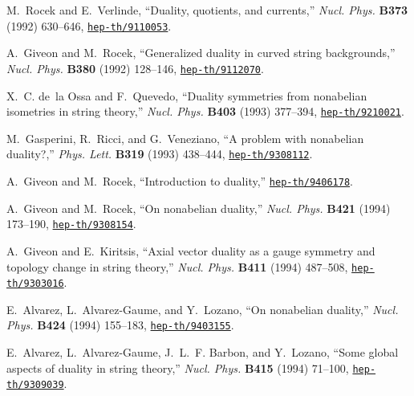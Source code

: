 \documentclass[a4paper,12pt]{article}
\begin{document}
\begin{thebibliography}{10}
M.~Rocek and E.~Verlinde, ``Duality, quotients, and currents,'' {\em Nucl.
  Phys.} {\bf B373} (1992) 630--646,
\href{http://www.arXiv.org/abs/hep-th/9110053}{{\tt hep-th/9110053}}.

A.~Giveon and M.~Rocek, ``Generalized duality in curved string backgrounds,''
  {\em Nucl. Phys.} {\bf B380} (1992) 128--146,
\href{http://www.arXiv.org/abs/hep-th/9112070}{{\tt hep-th/9112070}}.

X.~C. de~la Ossa and F.~Quevedo, ``Duality symmetries from nonabelian
  isometries in string theory,'' {\em Nucl. Phys.} {\bf B403} (1993) 377--394,
\href{http://www.arXiv.org/abs/hep-th/9210021}{{\tt hep-th/9210021}}.

M.~Gasperini, R.~Ricci, and G.~Veneziano, ``A problem with nonabelian
  duality?,'' {\em Phys. Lett.} {\bf B319} (1993) 438--444,
\href{http://www.arXiv.org/abs/hep-th/9308112}{{\tt hep-th/9308112}}.

A.~Giveon and M.~Rocek, ``Introduction to duality,''
\href{http://www.arXiv.org/abs/hep-th/9406178}{{\tt hep-th/9406178}}.

A.~Giveon and M.~Rocek, ``On nonabelian duality,'' {\em Nucl. Phys.} {\bf B421}
  (1994) 173--190,
\href{http://www.arXiv.org/abs/hep-th/9308154}{{\tt hep-th/9308154}}.

A.~Giveon and E.~Kiritsis, ``Axial vector duality as a gauge symmetry and
  topology change in string theory,'' {\em Nucl. Phys.} {\bf B411} (1994)
  487--508,
\href{http://www.arXiv.org/abs/hep-th/9303016}{{\tt hep-th/9303016}}.

E.~Alvarez, L.~Alvarez-Gaume, and Y.~Lozano, ``On nonabelian duality,'' {\em
  Nucl. Phys.} {\bf B424} (1994) 155--183,
\href{http://www.arXiv.org/abs/hep-th/9403155}{{\tt hep-th/9403155}}.

E.~Alvarez, L.~Alvarez-Gaume, J.~L.~F. Barbon, and Y.~Lozano, ``Some global
  aspects of duality in string theory,'' {\em Nucl. Phys.} {\bf B415} (1994)
  71--100,
\href{http://www.arXiv.org/abs/hep-th/9309039}{{\tt hep-th/9309039}}.


\end{thebibliography}
\end{document}
